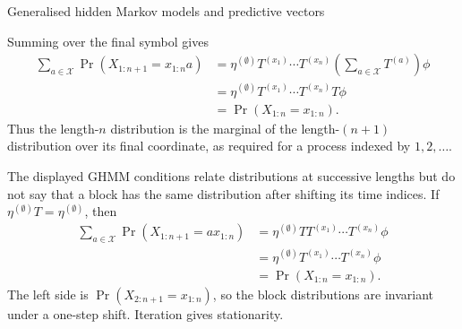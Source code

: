 \begin{exercise}[Extension]{Generalised hidden Markov models and predictive vectors}
\begin{solution}
\begin{parts}
\begin{subparts}
          \item Summing over the final symbol gives
            \[
              \begin{aligned}
                \sum_{a\in\mathcal X}
                  \Pr(X_{1:n+1}=x_{1:n}a)
                  &=
                  \eta^{(\emptyset)}
                    T^{(x_1)}\cdots T^{(x_n)}
                    \left(\sum_{a\in\mathcal X}T^{(a)}\right)\phi\\
                  &=
                  \eta^{(\emptyset)}
                    T^{(x_1)}\cdots T^{(x_n)}T\phi\\
                  &=\Pr(X_{1:n}=x_{1:n}).
              \end{aligned}
            \]
            Thus the length-$n$ distribution is the marginal of the
            length-$(n+1)$ distribution over its final coordinate, as
            required for a process indexed by $1,2,\ldots$.

          \item The displayed GHMM conditions relate distributions at
            successive lengths but do not say that a block has the same
            distribution after shifting its time indices. If
            $\eta^{(\emptyset)}T=\eta^{(\emptyset)}$, then
            \[
              \begin{aligned}
                \sum_{a\in\mathcal X}
                  \Pr(X_{1:n+1}=a x_{1:n})
                  &=
                  \eta^{(\emptyset)}T
                    T^{(x_1)}\cdots T^{(x_n)}\phi\\
                  &=
                  \eta^{(\emptyset)}
                    T^{(x_1)}\cdots T^{(x_n)}\phi\\
                  &=\Pr(X_{1:n}=x_{1:n}).
              \end{aligned}
            \]
            The left side is
            $\Pr(X_{2:n+1}=x_{1:n})$, so the block distributions are
            invariant under a one-step shift. Iteration gives stationarity.
        \end{subparts}


\end{parts}
\end{solution}
\end{exercise}
